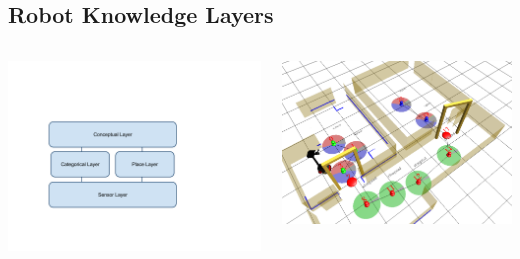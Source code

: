 \documentclass{beamer}
\begin{document}
\subsection{Robot Knowledge Layers}
\begin{frame}

\begin{columns}[t]
  \begin{column}{.5\textwidth}
    \includegraphics[width=.95\textwidth]{RobotLayers}
  \end{column}
  

  \begin{column}{.5\textwidth}
	\includegraphics[width=.95\textwidth]{screenshot-0003}
  \end{column}


\end{columns}
\end{frame}
\end{document}
